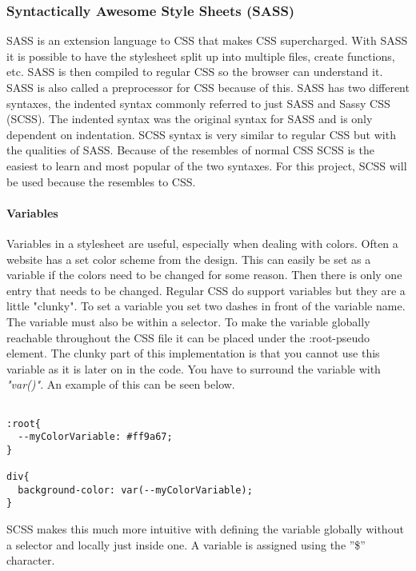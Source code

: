 \subsubsection{Syntactically Awesome Style Sheets (SASS)}%
\label{sub:sass}
SASS is an extension language to CSS that makes CSS supercharged. With SASS it is possible to have the stylesheet split up into multiple files, create functions, etc. SASS is then compiled to regular CSS so the browser can understand it. SASS is also called a preprocessor for CSS because of this. SASS has two different syntaxes, the indented syntax commonly referred to just SASS and Sassy CSS (SCSS). The indented syntax was the original syntax for SASS and is only dependent on indentation. SCSS syntax is very similar to regular CSS but with the qualities of SASS. Because of the resembles of normal CSS SCSS is the easiest to learn and most popular of the two syntaxes. For this project, SCSS will be used because the resembles to CSS.

\paragraph{Variables}
Variables in a stylesheet are useful, especially when dealing with colors. Often a website has a set color scheme from the design. This can easily be set as a variable if the colors need to be changed for some reason. Then there is only one entry that needs to be changed. Regular CSS do support variables but they are a little "clunky". To set a variable you set two dashes in front of the variable name. The variable must also be within a selector. To make the variable globally reachable throughout the CSS file it can be placed under the :root-pseudo element. The clunky part of this implementation is that you cannot use this variable as it is later on in the code. You have to surround the variable with \textit{"var()"}. An example of this can be seen below.

\begin{lstlisting}[style=htmlcssjs]

:root{
  --myColorVariable: #ff9a67; 
}

div{
  background-color: var(--myColorVariable);
}
\end{lstlisting}



SCSS makes this much more intuitive with defining the variable globally without a selector and locally just inside one. A variable is assigned using the ''\$'' character.

